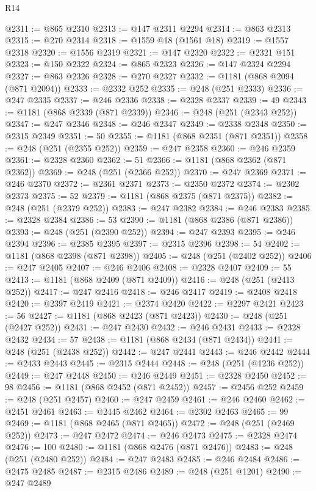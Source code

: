 \begin{lexlean}{R14}
\begin{coremodule}
@2311 := @865 @2310
@2313 := @147 @2311 @2294
@2314 := @863 @2313
@2315 := @270 @2314
@2318 := @1559 @18 (@1561 @18)
@2319 := @1557 @2318
@2320 := @1556 @2319
@2321 := @147 @2320
@2322 := @2321 @151
@2323 := @150 @2322
@2324 := @865 @2323
@2326 := @147 @2324 @2294
@2327 := @863 @2326
@2328 := @270 @2327
@2332 := @1181 (@868 @2094 (@871 @2094))
@2333 := @2332 @252
@2335 := @248 (@251 @2333)
@2336 := @247 @2335
@2337 := @246 @2336
@2338 := @2328 @2337
@2339 := 49
@2343 := @1181 (@868 @2339 (@871 @2339))
@2346 := @248 (@251 (@2343 @252))
@2347 := @247 @2346
@2348 := @246 @2347
@2349 := @2338 @2348
@2350 := @2315 @2349
@2351 := 50
@2355 := @1181 (@868 @2351 (@871 @2351))
@2358 := @248 (@251 (@2355 @252))
@2359 := @247 @2358
@2360 := @246 @2359
@2361 := @2328 @2360
@2362 := 51
@2366 := @1181 (@868 @2362 (@871 @2362))
@2369 := @248 (@251 (@2366 @252))
@2370 := @247 @2369
@2371 := @246 @2370
@2372 := @2361 @2371
@2373 := @2350 @2372
@2374 := @2302 @2373
@2375 := 52
@2379 := @1181 (@868 @2375 (@871 @2375))
@2382 := @248 (@251 (@2379 @252))
@2383 := @247 @2382
@2384 := @246 @2383
@2385 := @2328 @2384
@2386 := 53
@2390 := @1181 (@868 @2386 (@871 @2386))
@2393 := @248 (@251 (@2390 @252))
@2394 := @247 @2393
@2395 := @246 @2394
@2396 := @2385 @2395
@2397 := @2315 @2396
@2398 := 54
@2402 := @1181 (@868 @2398 (@871 @2398))
@2405 := @248 (@251 (@2402 @252))
@2406 := @247 @2405
@2407 := @246 @2406
@2408 := @2328 @2407
@2409 := 55
@2413 := @1181 (@868 @2409 (@871 @2409))
@2416 := @248 (@251 (@2413 @252))
@2417 := @247 @2416
@2418 := @246 @2417
@2419 := @2408 @2418
@2420 := @2397 @2419
@2421 := @2374 @2420
@2422 := @2297 @2421
@2423 := 56
@2427 := @1181 (@868 @2423 (@871 @2423))
@2430 := @248 (@251 (@2427 @252))
@2431 := @247 @2430
@2432 := @246 @2431
@2433 := @2328 @2432
@2434 := 57
@2438 := @1181 (@868 @2434 (@871 @2434))
@2441 := @248 (@251 (@2438 @252))
@2442 := @247 @2441
@2443 := @246 @2442
@2444 := @2433 @2443
@2445 := @2315 @2444
@2448 := @248 (@251 (@1236 @252))
@2449 := @247 @2448
@2450 := @246 @2449
@2451 := @2328 @2450
@2452 := 98
@2456 := @1181 (@868 @2452 (@871 @2452))
@2457 := @2456 @252
@2459 := @248 (@251 @2457)
@2460 := @247 @2459
@2461 := @246 @2460
@2462 := @2451 @2461
@2463 := @2445 @2462
@2464 := @2302 @2463
@2465 := 99
@2469 := @1181 (@868 @2465 (@871 @2465))
@2472 := @248 (@251 (@2469 @252))
@2473 := @247 @2472
@2474 := @246 @2473
@2475 := @2328 @2474
@2476 := 100
@2480 := @1181 (@868 @2476 (@871 @2476))
@2483 := @248 (@251 (@2480 @252))
@2484 := @247 @2483
@2485 := @246 @2484
@2486 := @2475 @2485
@2487 := @2315 @2486
@2489 := @248 (@251 @1201)
@2490 := @247 @2489

\end{coremodule}
\end{lexlean}
